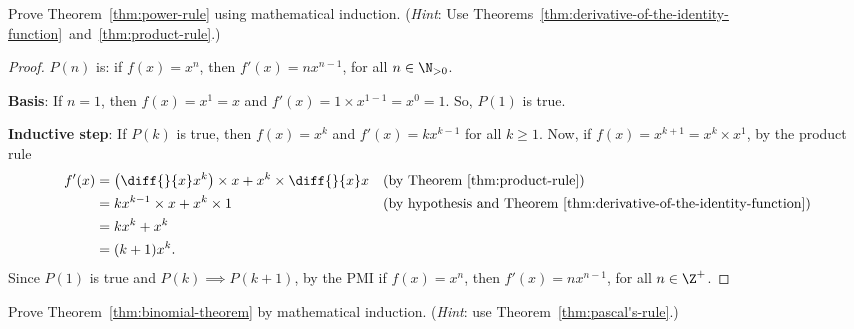\question[5]
Prove Theorem~\ref{thm:power-rule} using mathematical induction. (\emph{Hint}: Use Theorems~\ref{thm:derivative-of-the-identity-function}~and~\ref{thm:product-rule}.)

\begin{EnvFullwidth}
\begin{solutionorgrid}[4in]
\begin{proof}
$P(n)$ is: if $f(x) = x^n$, then $f'(x) = nx^{n - 1}$, for all $n \in \N_{> 0}$.

\textbf{Basis}: If $n = 1$, then $f(x) = x^1 = x$ and $f'(x) = 1 \times x^{1 - 1} = x^0 = 1$. So, $P(1)$ is true.

\textbf{Inductive step}: If $P(k)$ is true, then $f(x) = x^k$ and $f'(x) = kx^{k - 1}$ for all $k \geq 1$. Now, if $f(x) = x^{k + 1} = x^k \times x^1$, by the product rule
\begin{align*}
	f'(x) &= \left( \diff{}{x} x^k \right) \times x + x^k \times \diff{}{x} x && (\textrm{by Theorem~\ref{thm:product-rule}}) \\
	&= kx^{k - 1} \times x + x^k \times 1 && (\textrm{by hypothesis and Theorem~\ref{thm:derivative-of-the-identity-function}}) \\
	&= kx^k + x^k \\
	&= (k + 1)x^k.
\end{align*}
Since $P(1)$ is true and $P(k) \implies P(k + 1)$, by the PMI if $f(x) = x^n$, then $f'(x) = nx^{n - 1}$, for all $n \in \Z^+$.
\end{proof}
\end{solutionorgrid}
\end{EnvFullwidth}

\triast


\question[5]
Prove Theorem~\ref{thm:binomial-theorem} by mathematical induction. (\emph{Hint}: use Theorem~\ref{thm:pascal's-rule}.)


